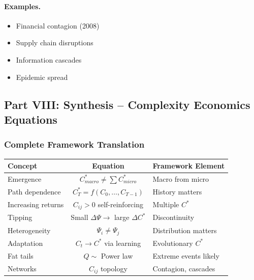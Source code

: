 \paragraph{Examples.}
\begin{itemize}
    \item Financial contagion (2008)
    \item Supply chain disruptions
    \item Information cascades
    \item Epidemic spread
\end{itemize}

\subsection{Part VIII: Synthesis – Complexity Economics Equations}

\subsubsection{Complete Framework Translation}

\begin{center}
\renewcommand{\arraystretch}{1.5}
\begin{tabular}{|l|c|l|}
\hline
\textbf{Concept} & \textbf{Equation} & \textbf{Framework Element} \\
\hline
Emergence & $C^*_{macro} \neq \sum C^*_{micro}$ & Macro from micro \\
\hline
Path dependence & $C^*_T = f(C_0, \ldots, C_{T-1})$ & History matters \\
\hline
Increasing returns & $C_{ij} > 0$ self-reinforcing & Multiple $C^*$ \\
\hline
Tipping & Small $\Delta\Psi \to$ large $\Delta C^*$ & Discontinuity \\
\hline
Heterogeneity & $\Psi_i \neq \Psi_j$ & Distribution matters \\
\hline
Adaptation & $C_t \to C^*$ via learning & Evolutionary $C^*$ \\
\hline
Fat tails & $Q \sim$ Power law & Extreme events likely \\
\hline
Networks & $C_{ij}$ topology & Contagion, cascades \\
\hline
\end{tabular}
\end{center}

